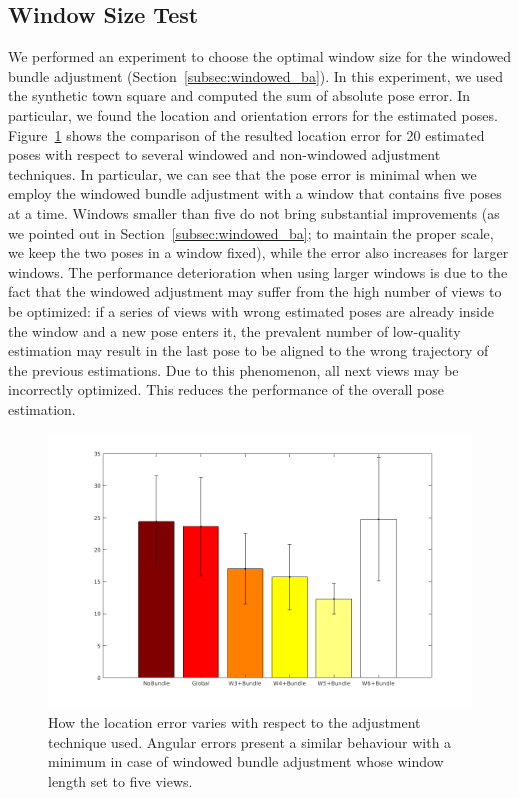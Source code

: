 \subsection{Window Size Test}
We performed an experiment to choose the optimal window size for the windowed
bundle adjustment (Section~\ref{subsec:windowed_ba}). In this experiment, we
used the synthetic town square and computed the sum of absolute pose error. In
particular, we found the location and orientation errors for the estimated poses.
Figure~\ref{fig:sumAbsLocError} shows the comparison of the resulted location error for 20
estimated poses with respect to several windowed and non-windowed adjustment
techniques.
In particular, we can see that the pose error is minimal when we employ the
windowed bundle adjustment with a window that contains five poses at a time.
Windows smaller than five do not bring substantial improvements (as we pointed out in
Section~\ref{subsec:windowed_ba}; to maintain the proper scale, we keep the two poses
in a window fixed), while the error also increases
for larger windows. The performance deterioration when using larger windows
is due to the fact that the windowed adjustment may suffer from the high number
of views to be optimized: if a series of views with wrong estimated poses are
already inside the window and a new pose enters it, the prevalent number of
low-quality estimation may result in the last pose to be aligned to the wrong trajectory
of the previous estimations. Due to this phenomenon, all next views
may be incorrectly optimized. This reduces the performance of the overall
pose estimation.
%
\begin{figure}[h]
\centering
\includegraphics[width=\linewidth]{img/sumAbsLocError.png}
\caption{How the location error varies with respect to the adjustment technique
used. Angular errors present a similar behaviour with a minimum in case
of windowed bundle adjustment whose window length set to five views.}
\label{fig:sumAbsLocError}
\end{figure}

